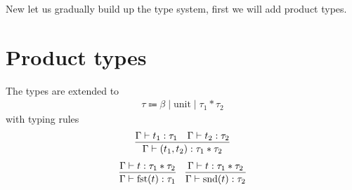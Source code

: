 New let us gradually build up the type system, first we will add product types.

\section{Product types}

The types are extended to
\begin{align*}
    \tau \Coloneqq \beta \mid \text{unit} \mid \tau_1 \ast \tau_2
\end{align*}
with typing rules
\begin{align*}
    \infer{\Gamma \vdash (t_1, t_2) : \tau_1 \ast \tau_2}{\Gamma \vdash t_1 :
    \tau_1 & \Gamma \vdash t_2 : \tau_2}
\end{align*}
\begin{align*}
    \infer{\Gamma \vdash \text{fst}(t) : \tau_1}{\Gamma \vdash t : \tau_1 \ast
    \tau_2}
    &&
    \infer{\Gamma \vdash \text{snd}(t) : \tau_2}{\Gamma \vdash t : \tau_1 \ast
    \tau_2}
\end{align*}
